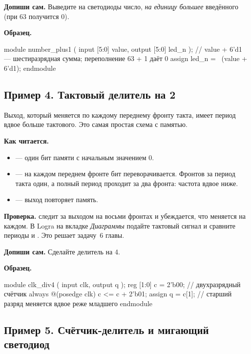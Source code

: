 \textbf{Допиши сам.} Выведите на светодиоды число, \emph{на единицу большее}
введённого (при 63 получится 0).

\textbf{Образец.}
\begin{vcode}
module number_plus1 (
    input  [5:0] value,
    output [5:0] led_n
);
    // value + 6'd1 --- шестиразрядная сумма; переполнение 63 + 1 даёт 0
    assign led_n = ~(value + 6'd1);
endmodule
\end{vcode}

\subsection{Пример 4. Тактовый делитель на 2}

Выход, который меняется по каждому переднему фронту такта, имеет период вдвое
больше тактового. Это самая простая схема с памятью.


\textbf{Как читается.}
\begin{itemize}
  \item {} --- один бит памяти с начальным значением 0.
  \item {} --- на каждом переднем фронте  бит переворачивается. Фронтов за период такта один, а  полный период проходит за два фронта: частота вдвое ниже.
  \item {} --- выход повторяет память.
\end{itemize}
\textbf{Проверка.}  следит за выходом на восьми фронтах и
убеждается, что  меняется на каждом. В Logra на вкладке \emph{Диаграммы}
подайте тактовый сигнал и сравните периоды  и . Это решает
задачу~6 главы.

\textbf{Допиши сам.} Сделайте делитель на 4.

\textbf{Образец.}
\begin{vcode}
module clk_div4 (
    input  clk,
    output q
);
    reg [1:0] c = 2'b00;                 // двухразрядный счётчик
    always @(posedge clk) c <= c + 2'b01;
    assign q = c[1];                     // старший разряд меняется вдвое реже младшего
endmodule
\end{vcode}

\subsection{Пример 5. Счётчик-делитель и мигающий светодиод}

